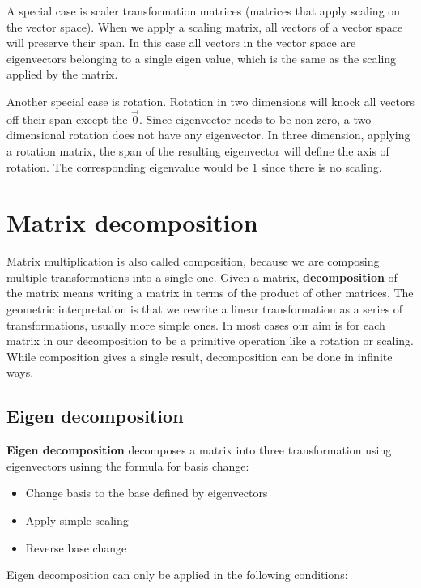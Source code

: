 A special case is scaler transformation matrices (matrices that apply scaling on the vector space). When we apply a scaling matrix, all vectors of a vector space will preserve their span. In this case all vectors in the vector space are eigenvectors belonging to a single eigen value, which is the same as the scaling applied by the matrix.

Another special case is rotation. Rotation in two dimensions will knock all vectors off their span except the \(\vec 0\). Since eigenvector needs to be non zero, a two dimensional rotation does not have any eigenvector. In three dimension, applying a rotation matrix, the span of the resulting eigenvector will define the axis of rotation. The corresponding eigenvalue would be \(1\) since there is no scaling.

\section{Matrix decomposition}

Matrix multiplication is also called composition, because we are composing multiple transformations into a single one. Given a matrix, \textbf{decomposition} of the matrix means writing a matrix in terms of the product of other matrices. The geometric interpretation is that we rewrite a linear transformation as a series of transformations, usually more simple ones. In most cases our aim is for each matrix in our decomposition to be a primitive operation like a rotation or scaling. While composition gives a single result, decomposition can be done in infinite ways.

\subsection{Eigen decomposition}

\textbf{Eigen decomposition} decomposes a matrix into three transformation using eigenvectors usinng the formula for basis change:

\begin{itemize}
    \item Change basis to the base defined by eigenvectors
    \item Apply simple scaling
    \item Reverse base change
\end{itemize}

Eigen decomposition can only be applied in the following conditions:

